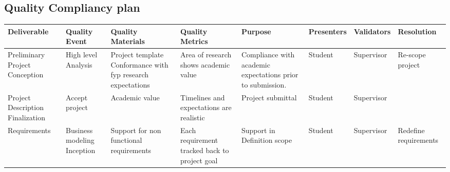 	\begin{landscape}
		
	\section{Quality Compliancy plan}	
		
	\begin{center}

		\begin{tabular}{ | >{\footnotesize}p{25mm} | >{\footnotesize}p{25mm} | >{\footnotesize}p{35mm} | >{\footnotesize}p{35mm} | >{\footnotesize}p{30mm} | >{\footnotesize}p{17mm} | >{\footnotesize}p{15mm} | >{\footnotesize}p{28mm} | }
			\hline

			  \textbf{Deliverable} 
			& \textbf{Quality Event} 	
			& \textbf{Quality Materials} 
			& \textbf{Quality Metrics} 
			& \textbf{Purpose} 	
			& \textbf{Presenters}
			& \textbf{Validators} 
			& \textbf{Resolution}\\ \hline
			
			
			\rowcolor[gray]{.98}
			  Preliminary Project \newline Conception 												
			& High level \newline Analysis					
			& Project template \newline  Conformance with fyp \newline research expectations	
			& Area of research shows academic value	
			& Compliance with \newline academic expectations \newline prior to submission.
			& Student
			& Supervisor
			& Re-scope project		
			\\ \hline
			
			
			  Project \newline Description \newline Finalization 												
			& Accept project					
			& Academic value 	
			& Timelines and expectations are realistic	
			& Project submittal 
			& Student
			& Supervisor
			& 		
			\\ \hline
			
			
			\rowcolor[gray]{.98}
			  Requirements 												
			& Business \newline modeling \newline Inception					
			& Support for non functional requirements 	
			& Each requirement \newline tracked back to \newline project goal  	
			& Support in \newline Definition scope 
			& Student
			& Supervisor
			& Redefine \newline requirements 		
			\\ \hline
			

\end{tabular}
\end{center}
\end{landscape}
